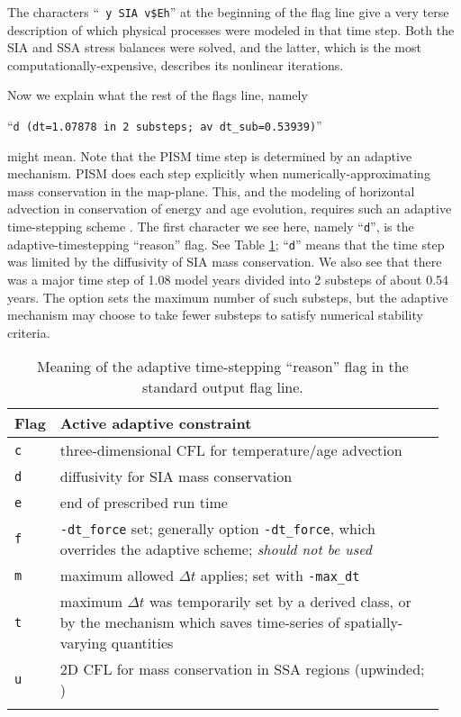 The characters ``\texttt{ y SIA v\$Eh}'' at the beginning of the flag line give a very terse description of which physical processes were modeled in that time step.  Both the SIA and SSA stress balances were solved, and the latter, which is the most computationally-expensive, describes its nonlinear iterations.

Now we explain what the rest of the flags line, namely

``\texttt{d (dt=1.07878 in 2 substeps; av dt_sub=0.53939)}''

\noindent might mean.  Note that the PISM time step is determined by an adaptive mechanism.  PISM does each step explicitly when numerically-approximating mass conservation in the map-plane.  This, and the modeling of horizontal advection in conservation of energy and age evolution, requires such an adaptive time-stepping scheme \cite{BBL}.  The first character we see here, namely ``\texttt{d}'', is the adaptive-timestepping ``reason'' flag.  See Table \ref{tab:adaptiveflag}; ``\texttt{d}'' means that the time step was limited by the diffusivity of SIA mass conservation.  We also see that there was a major time step of 1.08 model years divided into 2 substeps of about 0.54 years.  The  option sets the maximum number of such substeps, but the adaptive mechanism may choose to take fewer substeps to satisfy numerical stability criteria.

\begin{table}[ht]
\centering
\caption{Meaning of the adaptive time-stepping ``reason'' flag in the standard output flag line.}\label{tab:adaptiveflag}
\begin{tabular}{p{0.05\linewidth}p{0.9\linewidth}}\toprule
\textbf{Flag} & \textbf{Active adaptive constraint} \\ \midrule
\texttt{c} & three-dimensional CFL for temperature/age advection \cite{BBL} \\
\texttt{d} & diffusivity for SIA mass conservation \cite{BBL,HindmarshPayne} \\
\texttt{e} & end of prescribed run time \\
\texttt{f} & \texttt{-dt_force} set; generally option \texttt{-dt_force}, which overrides the adaptive scheme; \emph{should not be used}  \\
\texttt{m} & maximum allowed $\Delta t$ applies; set with \texttt{-max_dt} \\
\texttt{t} & maximum $\Delta t$ was temporarily set by a derived class, or by the mechanism which saves time-series of spatially-varying quantities \\
\texttt{u} & 2D CFL for mass conservation in SSA regions (upwinded; \cite{BBssasliding})\\
\bottomrule
\normalsize
\end{tabular}
\end{table}

